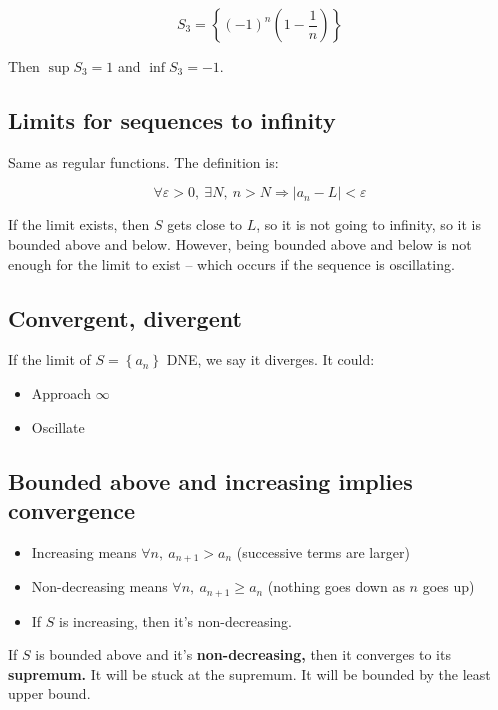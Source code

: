 \documentclass[12pt]{article}
\theoremstyle{plain}
\theoremstyle{remark}
\theoremstyle{definition}
\begin{document}
\[S_{3} = \left\{ ( - 1)^{n}\left( 1 - \frac{1}{n} \right) \right\}\]

Then \(\sup S_{3} = 1\) and \(\inf S_{3} = - 1\).


\subsection{Limits for sequences to
infinity}

Same as regular functions. The definition is:

\[\forall\varepsilon > 0,\ \exists N,\ n > N \Rightarrow \left| a_{n} - L \right| < \varepsilon\]

If the limit exists, then \(S\) gets close to \(L\), so it is not going
to infinity, so it is bounded above and below. However, being bounded
above and below is not enough for the limit to exist -- which occurs if
the sequence is oscillating.


\subsection{Convergent, divergent}

If the limit of \(S = \left\{ a_{n} \right\}\) DNE, we say it diverges.
It could:

\begin{itemize}
\item
  Approach \(\infty\)
\item
  Oscillate
\end{itemize}


\subsection{Bounded above and increasing implies
convergence}

\begin{itemize}
\item
  Increasing means \(\forall n,\ a_{n + 1} > a_{n}\) (successive terms
  are larger)
\item
  Non-decreasing means \(\forall n,\ a_{n + 1} \geq a_{n}\) (nothing
  goes down as \(n\) goes up)
\item
  If \(S\) is increasing, then it's non-decreasing.
\end{itemize}

If \(S\) is bounded above and it's \textbf{non-decreasing,} then it
converges to its \textbf{supremum.} It will be stuck at the supremum. It
will be bounded by the least upper bound.
\end{document}
